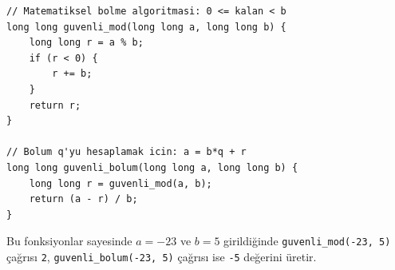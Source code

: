 \begin{lstlisting}[language=CTemel]
// Matematiksel bolme algoritmasi: 0 <= kalan < b
long long guvenli_mod(long long a, long long b) {
    long long r = a % b;
    if (r < 0) {
        r += b;
    }
    return r;
}

// Bolum q'yu hesaplamak icin: a = b*q + r
long long guvenli_bolum(long long a, long long b) {
    long long r = guvenli_mod(a, b);
    return (a - r) / b;
}
\end{lstlisting}

Bu fonksiyonlar sayesinde $a = -23$ ve $b = 5$ girildiğinde \texttt{guvenli\_mod(-23, 5)} çağrısı \texttt{2}, \texttt{guvenli\_bolum(-23, 5)} çağrısı ise \texttt{-5} değerini üretir.
